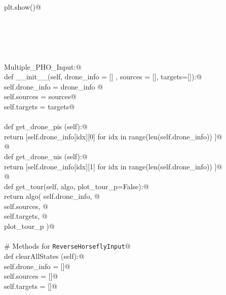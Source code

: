 \documentclass[10pt, english, oneside]{report}
\begin{document}
\begin{appendices}
\begin{flushleft}
\begin{list}{}{}
\mbox{}\verb@    plt.show()@\\
\mbox{}\verb@@\\
\mbox{}\verb@@\\
\mbox{}\verb@@\\
\mbox{}\verb@@\\
\mbox{}\verb@@\\
\mbox{}\verb@class Multiple_PHO_Input:@\\
\mbox{}\verb@    def __init__(self, drone_info = [] , sources = [], targets=[]):@\\
\mbox{}\verb@           self.drone_info = drone_info @\\
\mbox{}\verb@           self.sources     = sources@\\
\mbox{}\verb@           self.targets     = targets@\\
\mbox{}\verb@@\\
\mbox{}\verb@    def get_drone_pis (self):@\\
\mbox{}\verb@           return [self.drone_info[idx][0] for idx in range(len(self.drone_info)) ]@\\
\mbox{}\verb@           @\\
\mbox{}\verb@    def get_drone_uis (self):@\\
\mbox{}\verb@           return [self.drone_info[idx][1] for idx in range(len(self.drone_info)) ]@\\
\mbox{}\verb@         @\\
\mbox{}\verb@    def get_tour(self, algo, plot_tour_p=False):@\\
\mbox{}\verb@           return algo( self.drone_info, @\\
\mbox{}\verb@                        self.sources, @\\
\mbox{}\verb@                        self.targets, @\\
\mbox{}\verb@                        plot_tour_p    )@\\
\mbox{}\verb@@\\
\mbox{}\verb@    # Methods for \verb|ReverseHorseflyInput|@\\
\mbox{}\verb@    def clearAllStates (self):@\\
\mbox{}\verb@          self.drone_info = []@\\
\mbox{}\verb@          self.sources = []@\\
\mbox{}\verb@          self.targets = []@\\
\mbox{}\verb@@\\
\mbox{}\verb@@\\
\mbox{}\verb@@\\

\end{list}
\end{flushleft}
\end{appendices}
\end{document}
